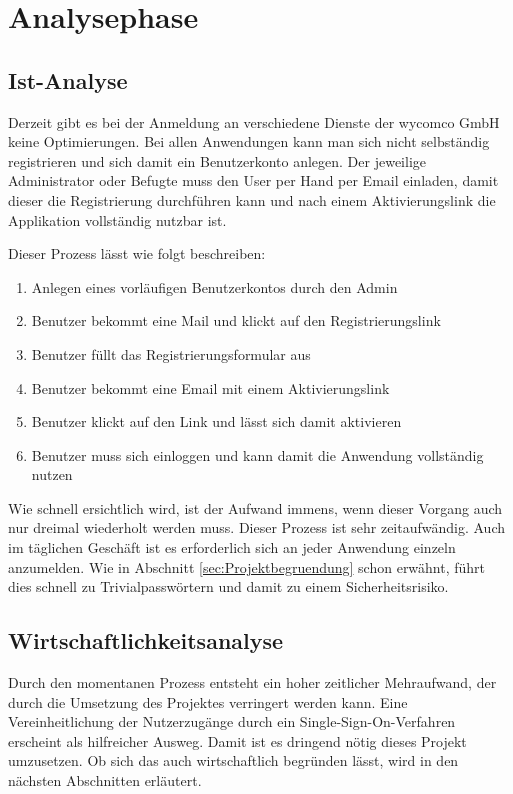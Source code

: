 \section{Analysephase} 
\label{sec:Analysephase}


\subsection{Ist-Analyse} 
\label{sec:IstAnalyse}

Derzeit gibt es bei der Anmeldung an verschiedene Dienste der wycomco GmbH keine Optimierungen. 
Bei allen Anwendungen kann man sich nicht selbständig registrieren und sich damit ein Benutzerkonto anlegen. Der jeweilige Administrator oder Befugte muss den User per Hand per Email einladen, damit dieser die Registrierung durchführen kann und nach einem Aktivierungslink die Applikation vollständig nutzbar ist. 

Dieser Prozess lässt wie folgt beschreiben:
\begin{enumerate}
	\item Anlegen eines vorläufigen Benutzerkontos durch den Admin
	\item Benutzer bekommt eine Mail und klickt auf den Registrierungslink
	\item Benutzer füllt das Registrierungsformular aus
	\item Benutzer bekommt eine Email mit einem Aktivierungslink
	\item Benutzer klickt auf den Link und lässt sich damit aktivieren
	\item Benutzer muss sich einloggen und kann damit die Anwendung vollständig nutzen
\end{enumerate}

Wie schnell ersichtlich wird, ist der Aufwand immens, wenn dieser Vorgang auch nur dreimal wiederholt werden muss.
Dieser Prozess ist sehr zeitaufwändig. Auch im täglichen Geschäft ist es erforderlich sich an jeder Anwendung einzeln anzumelden. Wie in Abschnitt \ref{sec:Projektbegruendung} schon erwähnt, führt dies schnell zu Trivialpasswörtern und damit zu einem Sicherheitsrisiko. 


\subsection{Wirtschaftlichkeitsanalyse}
\label{sec:Wirtschaftlichkeitsanalyse}

Durch den momentanen Prozess entsteht ein hoher zeitlicher Mehraufwand, der durch die Umsetzung des Projektes verringert werden kann.
Eine Vereinheitlichung der Nutzerzugänge durch ein Single-Sign-On-Verfahren erscheint als hilfreicher Ausweg.
Damit ist es dringend nötig dieses Projekt umzusetzen. Ob sich das auch wirtschaftlich begründen lässt, wird in den nächsten Abschnitten erläutert.


